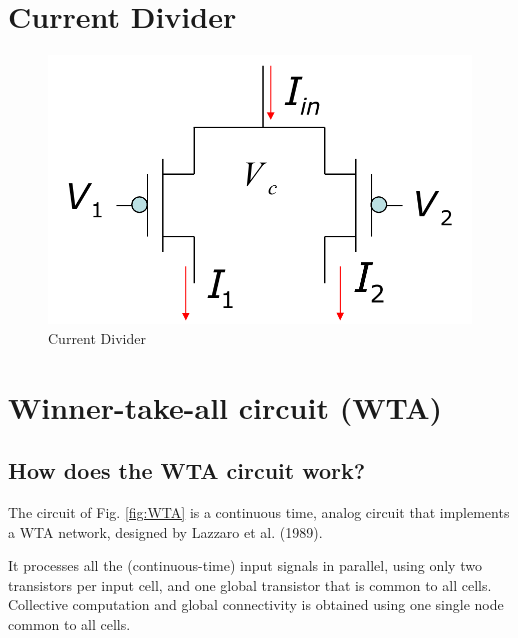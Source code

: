 \section{Current Divider}
\begin{figure}[htbp]
  \centering
  \includegraphics[scale=0.8]{pics/current_divider.png}
  \caption{Current Divider \cite{lec6}}
  \label{fig:current_divider}
\end{figure} 










\section{Winner-take-all circuit (WTA)}
\subsection{How does the WTA circuit work?}

The circuit of Fig. \ref{fig:WTA} is a continuous time, analog circuit that implements
a WTA network, designed by Lazzaro et al. (1989).

It processes all the (continuous-time) input signals in
parallel, using only two transistors per input cell, and one global transistor
that is common to all cells. Collective computation and global connectivity is
obtained using one single node common to all cells.

